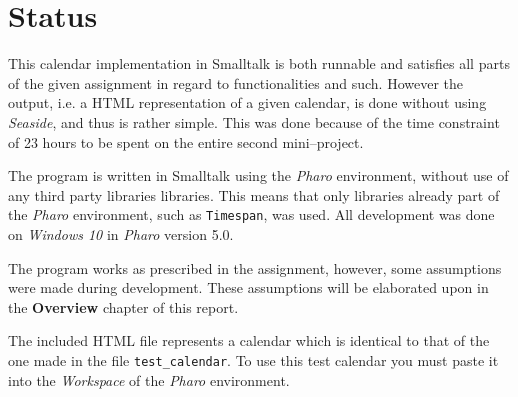 \chapter{Status}

This calendar implementation in Smalltalk is both runnable and satisfies all parts of the given assignment in regard to functionalities and such.
However the output, i.e. a HTML representation of a given calendar, is done without using \textit{Seaside}, and thus is rather simple.
This was done because of the time constraint of 23 hours to be spent on the entire second mini--project.

\medskip
The program is written in Smalltalk using the \textit{Pharo} environment, without use of any third party libraries libraries.
This means that only libraries already part of the \textit{Pharo} environment, such as \texttt{Timespan}, was used.
All development was done on \textit{Windows 10} in \textit{Pharo} version 5.0.

\medskip
The program works as prescribed in the assignment, however, some assumptions were made during development.
These assumptions will be elaborated upon in the \textbf{Overview} chapter of this report.

The included HTML file represents a calendar which is identical to that of the one made in the file \texttt{test\_calendar}.
To use this test calendar you must paste it into the \textit{Workspace} of the \textit{Pharo} environment.
